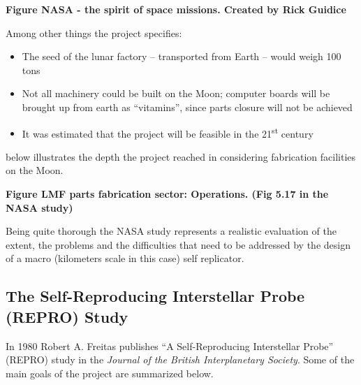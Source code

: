 \bigskip

{\bfseries
\label{bkm:Ref330929827}Figure  NASA - the spirit of space missions.
Created by Rick Guidice}


\bigskip

Among other things the project specifies:


\bigskip

\begin{itemize}
\item The seed of the lunar factory – transported from Earth – would
weigh 100 tons
\item Not all machinery could be built on the Moon; computer boards will
be brought up from earth as “vitamins”, since parts closure will not be
achieved
\item It was estimated that the project will be feasible in the
21\textsuperscript{st} century
\end{itemize}
 below illustrates the depth the project reached in considering
fabrication facilities on the Moon.


\bigskip

{\bfseries
\label{bkm:Ref330932474}Figure  LMF parts fabrication sector:
Operations. (Fig 5.17 in the NASA study)}


\bigskip

Being quite thorough the NASA study represents a realistic evaluation of
the extent, the problems and the difficulties that need to be addressed
by the design of a macro (kilometers scale in this case) self
replicator.


\bigskip

\subsection[The Self{}-Reproducing Interstellar Probe (REPRO) Study]{The
Self-Reproducing Interstellar Probe (REPRO) Study}
\hypertarget{RefHeading3156306210128}{}In 1980 Robert A. Freitas
publishes  “A Self-Reproducing Interstellar Probe” (REPRO) study  in
the \textit{Journal of the British Interplanetary Society}. Some of the
main goals of the project are summarized below.


\bigskip


